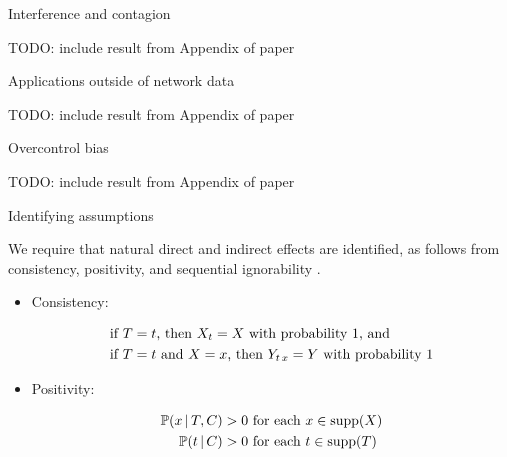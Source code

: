 \documentclass{beamer}
\theoremstyle{remark}
\begin{document}
\begin{frame}{Interference and contagion}

    TODO: include result from Appendix of paper

\end{frame}

\begin{frame}{Applications outside of network data}

    TODO: include result from Appendix of paper

\end{frame}

\begin{frame}{Overcontrol bias}

    TODO: include result from Appendix of paper

\end{frame}

\begin{frame}{Identifying assumptions}

    We require that natural direct and indirect effects are identified, as follows from consistency, positivity, and sequential ignorability \citep{imai_identification_2010}.

    \begin{itemize}

        \item Consistency:

              \begin{equation*}
                  \begin{aligned}
                       & \text{if $T = t$, then $X_t = X$ with probability 1, and}               \\
                       & \text{if $T = t$ and $X = x$, then $Y_{t \, x} = Y$ with probability 1}
                  \end{aligned}
              \end{equation*}

        \item Positivity:

              \begin{equation*}
                  \begin{aligned}
                      \P[T, \C]{x} & > 0 \text{ for each }  x \in \supp(\X) \\
                      \P[\C]{t}    & > 0 \text{ for each }  t \in \supp(T)
                  \end{aligned}
              \end{equation*}

    \end{itemize}

\end{frame}
\end{document}
